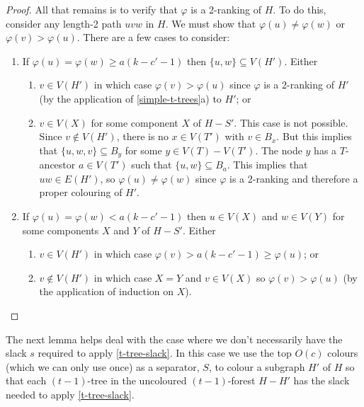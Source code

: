 \documentclass[kpfonts]{patmorin}
\theoremstyle{named}
\newcommand{\weirdref}[2]{\cref{#1}#2}
\begin{document}
\begin{proof}
   All that remains is to verify that $\varphi$ is a 2-ranking of $H$. To do this, consider any length-2 path $uvw$ in $H$.  We must show that $\varphi(u)\neq \varphi(w)$ or $\varphi(v)>\varphi(u)$.  There are a few cases to consider:
   \begin{enumerate}
    \item If $\varphi(u)=\varphi(w) \ge a(k-c'-1)$ then $\{u,w\}\subseteq V(H')$. Either
    \begin{enumerate}
       \item $v\in V(H')$ in which case $\varphi(v)>\varphi(u)$ since $\varphi$ is a 2-ranking of $H'$ (by the application of \weirdref{simple-t-trees}{a}) to $H'$; or
       \item $v\in V(X)$ for some component $X$ of $H-S'$. This case is not possible.  Since $v\not\in V(H')$, there is no $x\in V(T')$ with $v\in B_x$.  But this implies that $\{u,w,v\}\subseteq B_y$ for some $y\in V(T)-V(T')$.  The node $y$ has a $T$-ancestor $a\in V(T')$ such that $\{u,w\}\subseteq B_a$. This implies that $uw\in E(H')$, so $\varphi(u)\neq\varphi(w)$ since $\varphi$ is a 2-ranking and therefore a proper colouring of $H'$.
   \end{enumerate}
   \item If $\varphi(u)=\varphi(w) < a(k-c'-1)$ then $u\in V(X)$ and $w\in V(Y)$ for some components $X$ and $Y$ of $H-S'$.  Either
   \begin{enumerate}
    \item $v\in V(H')$ in which case $\varphi(v)>a(k-c'-1)\ge\varphi(u)$; or
    \item $v\not\in V(H')$ in which case $X=Y$ and $v\in V(X)$ so $\varphi(v)>\varphi(u)$ (by the application of induction on $X$). \qedhere
    \end{enumerate}
   \end{enumerate}
\end{proof}

The next lemma helps deal with the case where we don't necessarily have the slack $s$ required to apply \cref{t-tree-slack}.  In this case we use the top $O(c)$ colours (which we can only use once) as a separator, $S$, to colour a subgraph $H'$ of $H$ so that each $(t-1)$-tree in the uncoloured $(t-1)$-forest $H-H'$ has the slack needed to apply \cref{t-tree-slack}.
\end{document}
